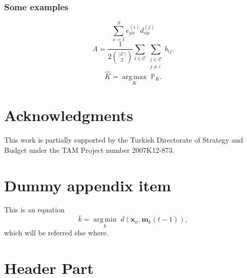 \documentclass[10pt,journal,compsoc]{IEEEtran}
\newcommand{\hAbs}[1]{\ensuremath{\left \lvert \, #1 \, \right \rvert} } %
\newcommand{\hArgmin}[2]{\underset{#1}{\operatorname{arg \, min}}\;#2}
\newcommand{\hArgmax}[2]{\underset{#1}{\operatorname{arg \, max}}\;#2}
\theoremstyle{plain}
\theoremstyle{definition}
\theoremstyle{remark}
\begin{document}
{%
\subsubsection{Some examples}

\[
	\sum_{x = 1}^{S} 
		e_{\mu x}^{(i)}
		d_{x \mu}^{(j)} 
\]
\[
	A= 	
	\frac
		{1}
		{2 {\hAbs{\mathcal{C}} \choose 2}} 
	\sum_{i \in \mathcal{C}}
	\sum_{
		\substack{
			j \in \mathcal{C}\\
			j \neq i
		}
	} 
	b_{ij}.
\]
\[
	\hat{K} =
		\hArgmax
			{K}
			{{\mathbb{P}_{K}}}.
\]




\section*{Acknowledgments}

This work is partially supported by 
the Turkish Directorate of Strategy and Budget
under the TAM Project number 2007K12-873.





\appendix
\newcommand{\hbAppendixPrefix}{A}
%
\renewcommand{\thefigure}{\hbAppendixPrefix\arabic{figure}}
\setcounter{figure}{0}
\renewcommand{\thetable}{\hbAppendixPrefix\arabic{table}} 
\setcounter{table}{0}
\renewcommand{\theequation}{\hbAppendixPrefix\arabic{equation}} 
\setcounter{equation}{0}




\section{Dummy appendix item}
	\label{sec:dummyAppendix}


This is an equation
\begin{equation}
	\label{eq:equationInAppendix}
	\bar{k} = \hArgmin{k} d(\mathbf{x}_{n},  \mathbf{m}_{k}(t-1)),
\end{equation}
which will be referred else where.




\section{Header Part}

}
\end{document}
